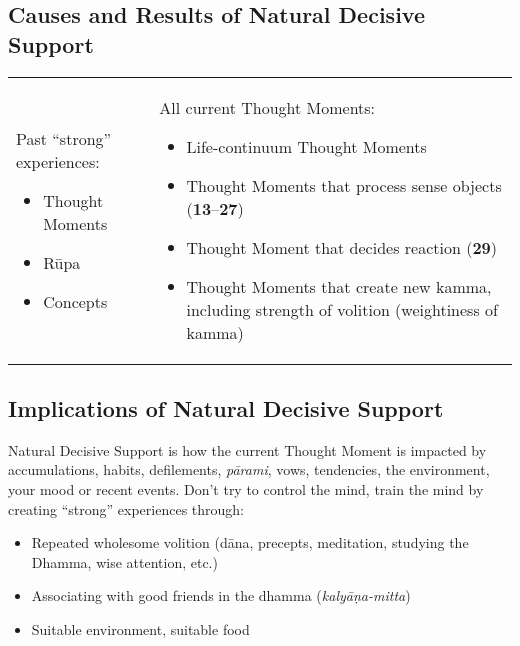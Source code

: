 \documentclass[a4 paper, 12pt]{article}
\begin{document}
\subsection*{Causes and Results of Natural Decisive Support}

\begin{tabular*}{\textwidth}{L{\tabcolsep} | L{\tabcolsep}}
\toprule
{} &  \\
\midrule

Past “strong” experiences:
\begin{itemize}
\item Thought Moments
\item Rūpa
\item Concepts
\end{itemize}

&
All current Thought Moments:
\begin{itemize}
\item Life-continuum Thought Moments
\item Thought Moments that process sense objects (\textbf{13}--\textbf{27})
\item Thought Moment that decides reaction (\textbf{29})
\item Thought Moments that create new kamma, including strength of volition (weightiness of kamma)\vspace*{-\baselineskip}
\end{itemize}\\
\bottomrule
\end{tabular*}

\subsection*{Implications of Natural Decisive Support}

Natural Decisive Support is how the current Thought Moment is impacted by accumulations, habits, defilements, \textit{pārami}, vows, tendencies, the environment, your mood or recent events. Don’t try to control the mind, train the mind by creating “strong” experiences through:

\begin{itemize}

\item Repeated wholesome volition (dāna, precepts, meditation, studying the Dhamma, wise attention, etc.)

\item Associating with good friends in the dhamma (\textit{kalyāṇa-mitta})

\item Suitable environment, suitable food

\end{itemize}
\end{document}

